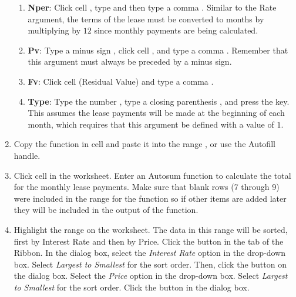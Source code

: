 \begin{enumerate}
\begin{enumerate}
		\item \textbf{Nper}: Click cell , type  and then type a comma \fmtTyping{,}. Similar to the Rate argument, the terms of the lease must be converted to months by multiplying by $ 12 $ since monthly payments are being calculated.
		
		\item \textbf{Pv}: Type a minus sign \fmtTyping{-}, click cell , and type a comma \fmtTyping{,}. Remember that this argument must always be preceded by a minus sign.
		
		\item \textbf{Fv}: Click cell  (Residual Value) and type a comma \fmtTyping{,}.
		
		\item \textbf{Type}: Type the number , type a closing parenthesis \fmtTyping{)}, and press the  key. This assumes the lease payments will be made at the beginning of each month, which requires that this argument be defined with a value of $ 1 $.
	\end{enumerate}

	\item Copy the  function in cell  and paste it into the range , or use the Autofill handle.
	
	\item Click cell  in the  worksheet. Enter an Autosum function to calculate the total for the monthly lease payments. Make sure that blank rows (7 through 9) were included in the range for the  function so if other items are added later they will be included in the output of the  function.
	
	\item Highlight the range  on the  worksheet. The data in this range will be sorted, first by Interest Rate and then by Price. Click the  button in the  tab of the Ribbon. In the  dialog box, select the \textit{Interest Rate} option in the  drop-down box. Select \textit{Largest to Smallest} for the sort order. Then, click the  button on the  dialog box. Select the \textit{Price} option in the  drop-down box. Select \textit{Largest to Smallest} for the sort order. Click the  button in the  dialog box.
	

\end{enumerate}
